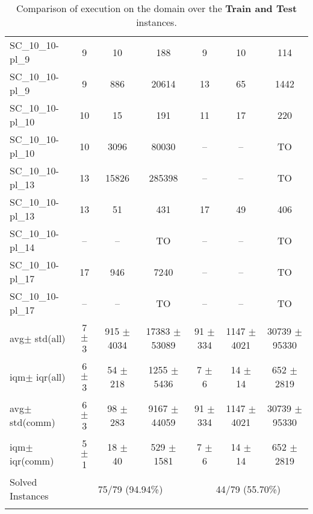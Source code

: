 \documentclass{article}
\newcommand{\unsolvedColumn}{--}
\newcommand{\myTO}{TO}
\newcommand{\myAvg}{avg}
\newcommand{\myStd}{std}
\newcommand{\IQM}{iqm}
\newcommand{\IQR}{iqr}
\newcommand{\allInstances}{all}
\newcommand{\onlyInCommon}{comm}
\begin{document}
\begin{longtable}[!ht]{l|ccc|ccc}
SC\_10\_10-pl\_9 & 9 & 10 & 188 & 9 & 10 & 114 \\
SC\_10\_10-pl\_9 & 9 & 886 & 20614 & 13 & 65 & 1442 \\
SC\_10\_10-pl\_10 & 10 & 15 & 191 & 11 & 17 & 220 \\
SC\_10\_10-pl\_10 & 10 & 3096 & 80030 & \unsolvedColumn & \unsolvedColumn & \myTO \\
SC\_10\_10-pl\_13 & 13 & 15826 & 285398 & \unsolvedColumn & \unsolvedColumn & \myTO \\
SC\_10\_10-pl\_13 & 13 & 51 & 431 & 17 & 49 & 406 \\
SC\_10\_10-pl\_14 & \unsolvedColumn & \unsolvedColumn & \myTO & \unsolvedColumn & \unsolvedColumn & \myTO \\
SC\_10\_10-pl\_17 & 17 & 946 & 7240 & \unsolvedColumn & \unsolvedColumn & \myTO \\
SC\_10\_10-pl\_17 & \unsolvedColumn & \unsolvedColumn & \myTO & \unsolvedColumn & \unsolvedColumn & \myTO \\
\hline
\myAvg  $\pm$ \myStd \hfill (\allInstances) & 7 $\pm$ 3 & 915 $\pm$ 4034 & 17383 $\pm$ 53089 & 91 $\pm$ 334 & 1147 $\pm$ 4021 & 30739 $\pm$ 95330 \\
\IQM $\pm$ \IQR \hfill (\allInstances) & 6 $\pm$ 3 & 54 $\pm$ 218 & 1255 $\pm$ 5436 & 7 $\pm$ 6 & 14 $\pm$ 14 & 652 $\pm$ 2819 \\
\myAvg  $\pm$ \myStd \hfill (\onlyInCommon) & 6 $\pm$ 3 & 98 $\pm$ 283 & 9167 $\pm$ 44059 & 91 $\pm$ 334 & 1147 $\pm$ 4021 & 30739 $\pm$ 95330 \\
\IQM $\pm$ \IQR \hfill (\onlyInCommon) & 5 $\pm$ 1 & 18 $\pm$ 40 & 529 $\pm$ 1581 & 7 $\pm$ 6 & 14 $\pm$ 14 & 652 $\pm$ 2819 \\
Solved Instances & \multicolumn{3}{c|}{75/79 (94.94\%)} & \multicolumn{3}{c}{44/79 (55.70\%)}
\\
\caption{Comparison of execution on the {} domain over the \textbf{Train and Test} instances.}
\label{tab:{final_reports}_{}_comparison_train_and_test}
\end{longtable}
\end{document}

